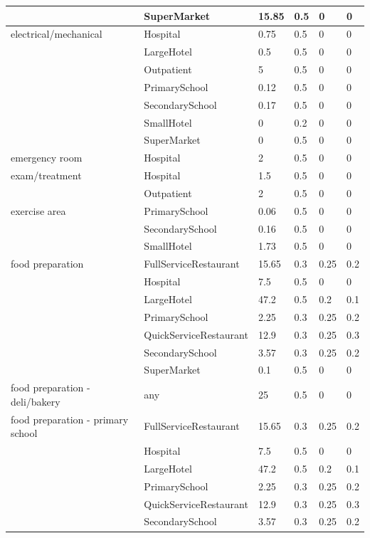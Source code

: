 \begin{center}
\begin{longtable}{|p{2.2in}|p{1.3in}|p{0.7in}|p{0.6in}|p{0.6in}|p{0.6in}|}
 & SuperMarket & 15.85 & 0.5 & 0 & 0 \\ \hline
electrical/mechanical & Hospital & 0.75 & 0.5 & 0 & 0 \\ \hline
 & LargeHotel & 0.5 & 0.5 & 0 & 0 \\ \hline
 & Outpatient & 5 & 0.5 & 0 & 0 \\ \hline
 & PrimarySchool & 0.12 & 0.5 & 0 & 0 \\ \hline
 & SecondarySchool & 0.17 & 0.5 & 0 & 0 \\ \hline
 & SmallHotel & 0 & 0.2 & 0 & 0 \\ \hline
 & SuperMarket & 0 & 0.5 & 0 & 0 \\ \hline
emergency room & Hospital & 2 & 0.5 & 0 & 0 \\ \hline
exam/treatment & Hospital & 1.5 & 0.5 & 0 & 0 \\ \hline
 & Outpatient & 2 & 0.5 & 0 & 0 \\ \hline
exercise area & PrimarySchool & 0.06 & 0.5 & 0 & 0 \\ \hline
 & SecondarySchool & 0.16 & 0.5 & 0 & 0 \\ \hline
 & SmallHotel & 1.73 & 0.5 & 0 & 0 \\ \hline
food preparation & FullServiceRestaurant & 15.65 & 0.3 & 0.25 & 0.2 \\ \hline
 & Hospital & 7.5 & 0.5 & 0 & 0 \\ \hline
 & LargeHotel & 47.2 & 0.5 & 0.2 & 0.1 \\ \hline
 & PrimarySchool & 2.25 & 0.3 & 0.25 & 0.2 \\ \hline
 & QuickServiceRestaurant & 12.9 & 0.3 & 0.25 & 0.3 \\ \hline
 & SecondarySchool & 3.57 & 0.3 & 0.25 & 0.2 \\ \hline
 & SuperMarket & 0.1 & 0.5 & 0 & 0 \\ \hline
food preparation - deli/bakery & any & 25 & 0.5 & 0 & 0 \\ \hline
food preparation - primary school & FullServiceRestaurant & 15.65 & 0.3 & 0.25 & 0.2 \\ \hline
 & Hospital & 7.5 & 0.5 & 0 & 0 \\ \hline
 & LargeHotel & 47.2 & 0.5 & 0.2 & 0.1 \\ \hline
 & PrimarySchool & 2.25 & 0.3 & 0.25 & 0.2 \\ \hline
 & QuickServiceRestaurant & 12.9 & 0.3 & 0.25 & 0.3 \\ \hline
 & SecondarySchool & 3.57 & 0.3 & 0.25 & 0.2 \\ \hline

\end{longtable}
\end{center}
